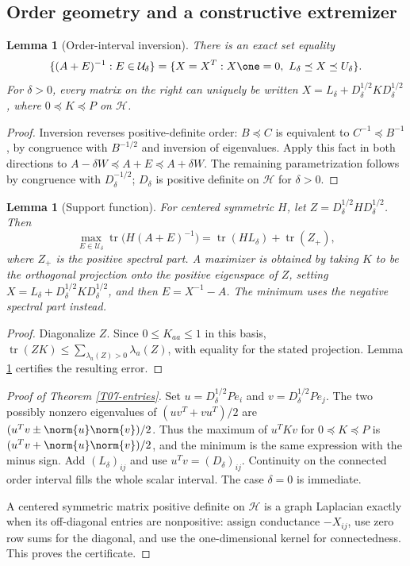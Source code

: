 \documentclass[11pt,a4paper]{article}
\newtheorem{lemma}[theorem]{Lemma}
\theoremstyle{definition}\newtheorem{definition}[theorem]{Definition}
\theoremstyle{remark}\newtheorem{remark}[theorem]{Remark}
\DeclareMathOperator{\tr}{tr}\DeclareMathOperator{\supp}{supp}\DeclareMathOperator{\TV}{TV}
\numberwithin{equation}{section}
\begin{document}
\subsection{Order geometry and a constructive extremizer}\label{T07-sec-2}
\begin{lemma}[Order-interval inversion]\label{T07-order}
There is an exact set equality
\[
 \{(A+E)^{-1}:E\in\mathcal U_\delta\}
 =\{X=X^T:X\one=0,\ L_\delta\preceq X\preceq U_\delta\}.
\]
For $\delta>0$, every matrix on the right can uniquely be written
$X=L_\delta+D_\delta^{1/2}KD_\delta^{1/2}$, where $0\preceq K\preceq P$ on $\mathcal H$.
\end{lemma}
\begin{proof}
Inversion reverses positive-definite order: $B\preceq C$ is equivalent to $C^{-1}\preceq B^{-1}$, by congruence with $B^{-1/2}$ and inversion of eigenvalues. Apply this fact in both directions to
$A-\delta W\preceq A+E\preceq A+\delta W$.
The remaining parametrization follows by congruence with $D_\delta^{-1/2}$; $D_\delta$ is positive definite on $\mathcal H$ for $\delta>0$.
\end{proof}
\begin{lemma}[Support function]\label{T07-support}
For centered symmetric $H$, let $Z=D_\delta^{1/2}HD_\delta^{1/2}$. Then
\[
 \max_{E\in\mathcal U_\delta}\tr\bigl(H(A+E)^{-1}\bigr)
 =\tr(HL_\delta)+\tr(Z_+),
\]
where $Z_+$ is the positive spectral part. A maximizer is obtained by taking $K$ to be the orthogonal projection onto the positive eigenspace of $Z$, setting $X=L_\delta+D_\delta^{1/2}KD_\delta^{1/2}$, and then $E=X^{-1}-A$. The minimum uses the negative spectral part instead.
\end{lemma}
\begin{proof}
Diagonalize $Z$. Since $0\le K_{aa}\le1$ in this basis, $\tr(ZK)\le\sum_{\lambda_a(Z)>0}\lambda_a(Z)$, with equality for the stated projection. Lemma \ref{T07-order} certifies the resulting error.
\end{proof}
\begin{proof}[Proof of Theorem \ref{T07-entries}]
Set $u=D_\delta^{1/2}Pe_i$ and $v=D_\delta^{1/2}Pe_j$. The two possibly nonzero eigenvalues of $(uv^T+vu^T)/2$ are
$(u^Tv\pm\norm{u}\norm{v})/2$.
Thus the maximum of $u^TKv$ for $0\preceq K\preceq P$ is
$(u^Tv+\norm{u}\norm{v})/2$, and the minimum is the same expression with the minus sign. Add $(L_\delta)_{ij}$ and use $u^Tv=(D_\delta)_{ij}$. Continuity on the connected order interval fills the whole scalar interval. The case $\delta=0$ is immediate.

A centered symmetric matrix positive definite on $\mathcal H$ is a graph Laplacian exactly when its off-diagonal entries are nonpositive: assign conductance $-X_{ij}$, use zero row sums for the diagonal, and use the one-dimensional kernel for connectedness. This proves the certificate.
\end{proof}
\end{document}
